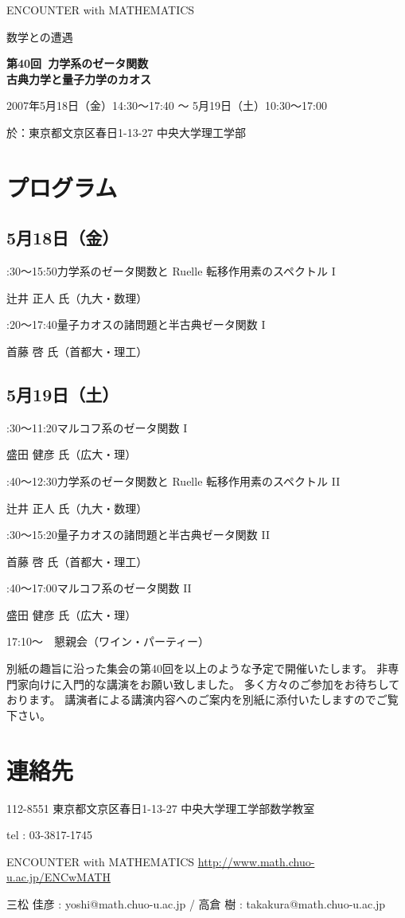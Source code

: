 \documentclass[uplatex,dvipdfmx]{jlreq}
\newcommand{\talk}[3]{%
\noindent
#1\quad #2\par
\hspace*{2em}#3\par\smallskip
}
\newcommand{\EwMnumber}{第40回}
\newcommand{\EwMtitle}{力学系のゼータ関数\\[2mm]\large 古典力学と量子力学のカオス}
\newcommand{\EwMdate}{2007年5月18日（金）14:30～17:40 ～ 5月19日（土）10:30～17:00}
\newcommand{\EwMplace}{東京都文京区春日1-13-27 中央大学理工学部}
\newcommand{\EwMtitleblock}{

\vspace*{-5mm}

\begin{center}

{\Large ENCOUNTER with MATHEMATICS}

\vspace{2mm}

{\large 数学との遭遇}

\vspace{4mm}

{\Large \bfseries \EwMnumber\ \EwMtitle}

\vspace{4mm}

\EwMdate

\vspace{2mm}

於：\EwMplace

\end{center}

\vspace{2mm}

}
\begin{document}
\EwMtitleblock


\section*{プログラム}

\subsection*{5月18日（金）}

\talk
{14:30～15:50}
{力学系のゼータ関数と Ruelle 転移作用素のスペクトル I}
{辻井 正人 氏（九大・数理）}

\talk
{16:20～17:40}
{量子カオスの諸問題と半古典ゼータ関数 I}
{首藤 啓 氏（首都大・理工）}

\subsection*{5月19日（土）}

\talk
{10:30～11:20}
{マルコフ系のゼータ関数 I}
{盛田 健彦 氏（広大・理）}

\talk
{11:40～12:30}
{力学系のゼータ関数と Ruelle 転移作用素のスペクトル II}
{辻井 正人 氏（九大・数理）}

\talk
{14:30～15:20}
{量子カオスの諸問題と半古典ゼータ関数 II}
{首藤 啓 氏（首都大・理工）}

\talk
{15:40～17:00}
{マルコフ系のゼータ関数 II}
{盛田 健彦 氏（広大・理）}

\bigskip

17:10～　懇親会（ワイン・パーティー）


\bigskip

別紙の趣旨に沿った集会の第40回を以上のような予定で開催いたします。  
非専門家向けに入門的な講演をお願い致しました。  
多く方々のご参加をお待ちしております。  
講演者による講演内容へのご案内を別紙に添付いたしますのでご覧下さい。


\section*{連絡先}

112-8551 東京都文京区春日1-13-27 中央大学理工学部数学教室 

tel : 03-3817-1745  

ENCOUNTER with MATHEMATICS  
\url{http://www.math.chuo-u.ac.jp/ENCwMATH}  

三松 佳彦 : yoshi@math.chuo-u.ac.jp / 高倉 樹 : takakura@math.chuo-u.ac.jp
\end{document}
